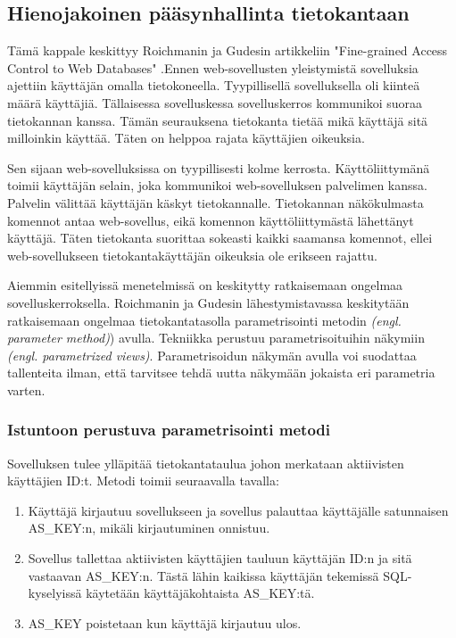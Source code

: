 \documentclass[finnish]{tktltiki2}
\theoremstyle{definition}
\theoremstyle{remark}
\begin{document}
		\subsection{Hienojakoinen pääsynhallinta tietokantaan}
		Tämä kappale keskittyy Roichmanin ja Gudesin artikkeliin "Fine-grained Access Control to Web Databases" \cite{access}.\space Ennen web-sovellusten yleistymistä sovelluksia ajettiin käyttäjän omalla tietokoneella. Tyypillisellä sovelluksella oli kiinteä määrä  käyttäjiä. Tällaisessa sovelluskessa sovelluskerros kommunikoi suoraa tietokannan kanssa. Tämän seurauksena tietokanta tietää mikä käyttäjä sitä milloinkin käyttää. Täten on helppoa rajata käyttäjien oikeuksia.
		
		Sen sijaan web-sovelluksissa on tyypillisesti kolme kerrosta. Käyttöliittymänä toimii käyttäjän selain, joka kommunikoi web-sovelluksen palvelimen kanssa. Palvelin välittää käyttäjän käskyt tietokannalle. Tietokannan näkökulmasta komennot antaa web-sovellus, eikä komennon käyttöliittymästä lähettänyt käyttäjä. Täten tietokanta suorittaa sokeasti kaikki saamansa komennot, ellei web-sovellukseen tietokantakäyttäjän oikeuksia ole erikseen rajattu.
		
		Aiemmin esitellyissä menetelmissä on keskitytty ratkaisemaan ongelmaa sovelluskerroksella. Roichmanin ja Gudesin lähestymistavassa keskitytään ratkaisemaan ongelmaa tietokantatasolla parametrisointi metodin \textit{(engl. parameter method)}) avulla. Tekniikka perustuu parametrisoituihin näkymiin \textit{(engl. parametrized views)}. Parametrisoidun näkymän avulla voi suodattaa tallenteita ilman, että tarvitsee tehdä uutta näkymään jokaista eri parametria varten.
		
		\subsubsection {Istuntoon perustuva parametrisointi metodi}
		Sovelluksen tulee ylläpitää tietokantataulua johon merkataan aktiivisten käyttäjien ID:t. Metodi toimii seuraavalla tavalla:
		\begin{enumerate}
			\item Käyttäjä kirjautuu sovellukseen ja sovellus palauttaa käyttäjälle satunnaisen AS\_KEY:n, mikäli kirjautuminen onnistuu.
			
			\item Sovellus tallettaa aktiivisten käyttäjien tauluun käyttäjän ID:n ja sitä vastaavan AS\_KEY:n. Tästä lähin kaikissa käyttäjän tekemissä SQL-kyselyissä käytetään käyttäjäkohtaista AS\_KEY:tä.
			
			\item AS\_KEY poistetaan kun käyttäjä kirjautuu ulos.
		\end{enumerate}
		
\end{document}
